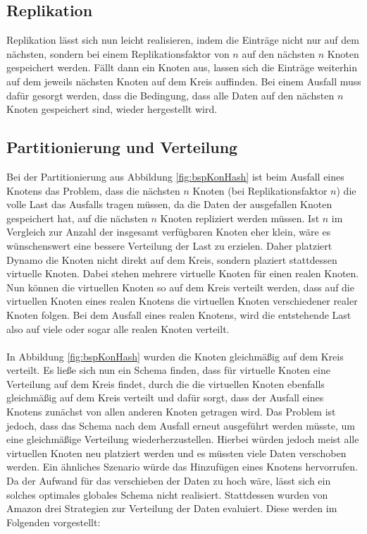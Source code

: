 \subsection{Replikation}
Replikation lässt sich nun leicht realisieren, indem die Einträge nicht nur auf dem nächsten, sondern bei einem Replikationsfaktor von $n$ auf den nächsten $n$ Knoten gespeichert werden. Fällt dann ein Knoten aus, lassen sich die Einträge weiterhin auf dem jeweils nächsten Knoten auf dem Kreis auffinden. Bei einem Ausfall muss dafür gesorgt werden, dass die Bedingung, dass alle Daten auf den nächsten $n$ Knoten gespeichert sind, wieder hergestellt wird.
\subsection{Partitionierung und Verteilung}
Bei der Partitionierung aus Abbildung \ref{fig:bspKonHash} ist beim Ausfall eines Knotens das Problem, dass die nächsten $n$ Knoten (bei Replikationsfaktor $n$) die volle Last das Ausfalls tragen müssen, da die Daten der ausgefallen Knoten gespeichert hat, auf die nächsten $n$ Knoten repliziert werden müssen. Ist $n$ im Vergleich zur Anzahl der insgesamt verfügbaren Knoten eher klein, wäre es wünschenswert eine bessere Verteilung der Last zu erzielen. Daher platziert Dynamo die Knoten nicht direkt auf dem Kreis, sondern plaziert stattdessen virtuelle Knoten. Dabei stehen mehrere virtuelle Knoten für einen realen Knoten. Nun können die virtuellen Knoten so auf dem Kreis verteilt werden, dass auf die virtuellen Knoten eines realen Knotens die virtuellen Knoten verschiedener realer Knoten folgen. Bei dem Ausfall eines realen Knotens, wird die entstehende Last also auf viele oder sogar alle realen Knoten verteilt.\\
\\
In Abbildung \ref{fig:bspKonHash} wurden die Knoten gleichmäßig auf dem Kreis verteilt. Es ließe sich nun ein Schema finden, dass für virtuelle Knoten eine Verteilung auf dem Kreis findet, durch die die virtuellen Knoten ebenfalls gleichmäßig auf dem Kreis verteilt und dafür sorgt, dass der Ausfall eines Knotens zunächst von allen anderen Knoten getragen wird. Das Problem ist jedoch, dass das Schema nach dem Ausfall erneut ausgeführt werden müsste, um eine gleichmäßige Verteilung wiederherzustellen. Hierbei würden jedoch meist alle virtuellen Knoten neu platziert werden und es müssten viele Daten verschoben werden. Ein ähnliches Szenario würde das Hinzufügen eines Knotens hervorrufen. Da der Aufwand für das verschieben der Daten zu hoch wäre, lässt sich ein solches optimales globales Schema nicht realisiert. Stattdessen wurden von Amazon drei Strategien zur Verteilung der Daten evaluiert. Diese werden im Folgenden vorgestellt:

